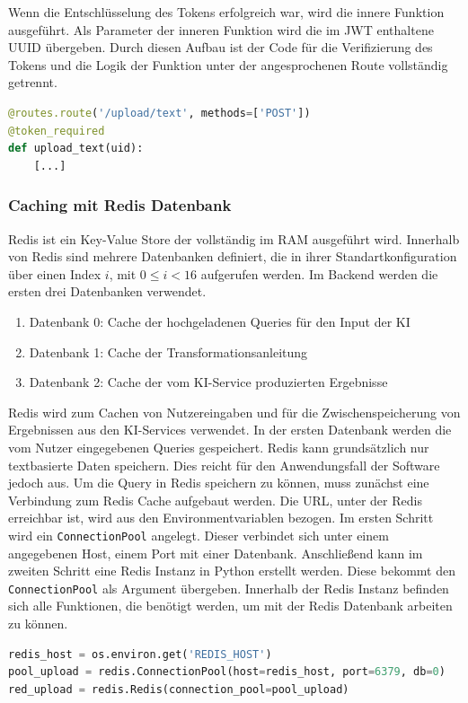 Wenn die Entschlüsselung des Tokens erfolgreich war, wird die innere Funktion ausgeführt. Als Parameter der inneren Funktion wird die im JWT enthaltene UUID übergeben. Durch diesen Aufbau ist der Code für die Verifizierung des Tokens und die Logik der Funktion unter der angesprochenen Route vollständig getrennt.

\begin{lstlisting}[language=Python]
@routes.route('/upload/text', methods=['POST'])
@token_required
def upload_text(uid):
    [...]
\end{lstlisting}

\subsubsection{Caching mit Redis Datenbank}
Redis ist ein Key-Value Store der vollständig im RAM ausgeführt wird. Innerhalb von Redis sind mehrere Datenbanken definiert, die in ihrer Standartkonfiguration über einen Index $i$, mit $0\leq{}i<16$ aufgerufen werden. Im Backend werden die ersten drei Datenbanken verwendet.
\begin{enumerate}
 \item Datenbank 0: Cache der hochgeladenen Queries für den Input der KI
 \item Datenbank 1: Cache der Transformationsanleitung
 \item Datenbank 2: Cache der vom KI-Service produzierten Ergebnisse
\end{enumerate} 

Redis wird zum Cachen von Nutzereingaben und für die Zwischenspeicherung von Ergebnissen aus den KI-Services verwendet. In der ersten Datenbank werden die vom Nutzer eingegebenen Queries gespeichert. Redis kann grundsätzlich nur textbasierte Daten speichern. Dies reicht für den Anwendungsfall der Software jedoch aus. Um die Query in Redis speichern zu können, muss zunächst eine Verbindung zum Redis Cache aufgebaut werden. Die URL, unter der Redis erreichbar ist, wird aus den Environmentvariablen bezogen. Im ersten Schritt wird ein \texttt{ConnectionPool} angelegt. Dieser verbindet sich unter einem angegebenen Host, einem Port mit einer Datenbank. Anschließend kann im zweiten Schritt eine Redis Instanz in Python erstellt werden. Diese bekommt den \texttt{ConnectionPool} als Argument übergeben. Innerhalb der Redis Instanz befinden sich alle Funktionen, die benötigt werden, um mit der Redis Datenbank arbeiten zu können.

\begin{lstlisting}[language=Python]
redis_host = os.environ.get('REDIS_HOST')
pool_upload = redis.ConnectionPool(host=redis_host, port=6379, db=0)
red_upload = redis.Redis(connection_pool=pool_upload)
\end{lstlisting}

